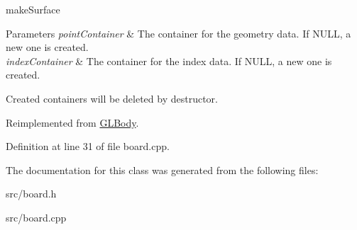 make\+Surface 


\begin{DoxyParams}{Parameters}
{\em point\+Container} & The container for the geometry data. If N\+U\+LL, a new one is created. \\
\hline
{\em index\+Container} & The container for the index data. If N\+U\+LL, a new one is created.\\
\hline
\end{DoxyParams}
Created containers will be deleted by destructor. 

Reimplemented from \mbox{\hyperlink{class_g_l_body_a73e51b159f343d0bda87f50df382b7db}{G\+L\+Body}}.



Definition at line 31 of file board.\+cpp.



The documentation for this class was generated from the following files\+:\begin{DoxyCompactItemize}
\item 
src/board.\+h\item 
src/board.\+cpp\end{DoxyCompactItemize}
